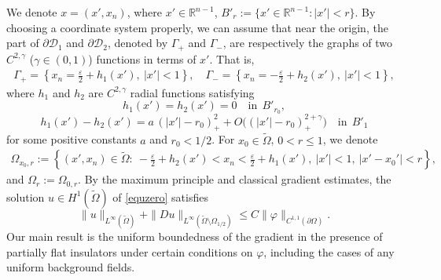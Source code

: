 \documentclass[reqno, 10pt]{amsart}
\theoremstyle{plain}
\theoremstyle{definition}
\theoremstyle{remark}
\numberwithin{equation}{section}
\newcommand{\bR}{\mathbb{R}}
\begin{document}
We denote $x = (x', x_n)$, where $x' \in \mathbb{R}^{n-1}$, $B'_r:= \{x' \in \bR^{n-1} : |x'|< r\}$. By choosing a coordinate system properly, we can assume that near the origin, the part of $\partial \mathcal{D}_1$ and $\partial \mathcal{D}_2$, denoted by $\Gamma_+$ and $\Gamma_-$, are respectively the graphs of two $C^{2,\gamma}$ ($\gamma\in (0,1)$) functions in terms of $x'$. That is,
\begin{align*}%
\Gamma_+ = \left\{ x_n = \frac{\varepsilon}{2}+h_1(x'),~|x'|<1\right\},\quad \Gamma_- = \left\{ x_n = -\frac{\varepsilon}{2}+h_2(x'),~|x'|<1\right\},
\end{align*}
where $h_1$ and $h_2$ are $C^{2,\gamma}$ radial functions satisfying 
\begin{equation}\label{fg_0}
h_1(x')=h_2(x')=0 \quad \mbox{in}~~B'_{r_0},
\end{equation}
\begin{equation}\label{fg_1}
h_1(x') - h_2(x') = a\,(|x'|-r_0)^2_+ + O \Big( (|x'|-r_0)^{2+\gamma}_+ \Big) \quad \mbox{in}~~B'_{1}
\end{equation}
for some positive constants $a$ and $r_0 < 1/2$. For $x_0 \in \widetilde\Omega$, $0 < r\leq 1$, we denote
\begin{align*}%
\Omega_{x_0,r}:=\left\{(x',x_{n})\in \widetilde{\Omega}:~-\frac{\varepsilon}{2}+h_2(x')<x_{n}<\frac{\varepsilon}{2}+h_1(x'),~|x'|<1,~|x'-x_0' |<r\right\},
\end{align*}
and $\Omega_{r}:=\Omega_{0,r}$.
By the maximum principle and classical gradient estimates, the solution $u \in H^1(\widetilde\Omega)$ of \eqref{equzero} satisfies
\begin{equation}
\label{u_C1_outside}
\|u\|_{L^\infty(\widetilde\Omega)} + \| D u\|_{{L^\infty}(\widetilde\Omega \setminus \Omega_{1/2})} \le C\|\varphi\|_{C^{1,1}(\partial \Omega)}.
\end{equation}
Our main result is the uniform boundedness of the gradient in the presence of partially flat insulators under certain conditions on $\varphi$, including the cases of any uniform background fields.
\end{document}
